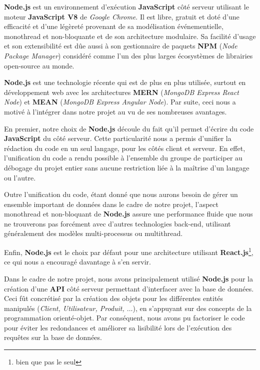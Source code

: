 \documentclass[a4paper,12pt]{report}
\theoremstyle{break}
\theoremstyle{break}
\theoremstyle{break}
\theoremstyle{break}
\theoremstyle{definition}
\theoremstyle{remark}
\begin{document}
\textbf{Node.js} est un environnement d'exécution \textbf{JavaScript} côté serveur utilisant le moteur \textbf{JavaScript V8} de \textit{Google Chrome}. Il est libre, gratuit et doté d'une efficacité et d'une légèreté provenant de sa modélisation événementielle, monothread et non-bloquante et de son architecture modulaire. Sa facilité d'usage et son extensibilité est dûe aussi à son gestionnaire de paquets \textbf{NPM} (\textit{Node Package Manager}) considéré comme l'un des plus larges écosystèmes de librairies open-source au monde.

\textbf{Node.js} est une technologie récente qui est de plus en plus utilisée, surtout en développement web avec les architectures \textbf{MERN} (\textit{MongoDB Express React Node}) et \textbf{MEAN} (\textit{MongoDB Express Angular Node}). Par suite, ceci nous a motivé à l'intégrer dans notre projet au vu de ses nombreuses avantages.

En premier, notre choix de \textbf{Node.js} découle du fait qu'il permet d'écrire du code \textbf{JavaScript} du côté serveur. Cette particularité nous a permis d'unifier la rédaction du code en un seul langage, pour les côtés client et serveur. En effet, l'unification du code a rendu possible à l'ensemble du groupe de participer au débogage du projet entier sans aucune restriction liée à la maîtrise d'un langage ou l'autre.

Outre l'unification du code, étant donné que nous aurons besoin de gérer un ensemble important de données dans le cadre de notre projet, l'aspect monothread et non-bloquant de \textbf{Node.js} assure une performance fluide que nous ne trouverons pas forcément avec d'autres technologies back-end, utilisant généralement des modèles multi-processus ou multithread.

Enfin, \textbf{Node.js} est le choix par défaut pour une architecture utilisant \textbf{React.js}\footnote{bien que pas le seul}, ce qui nous a encouragé davantage à s'en servir.

Dans le cadre de notre projet, nous avons principalement utilisé \textbf{Node.js} pour la création d'une \textbf{API} côté serveur permettant d'interfacer avec la base de données. Ceci fût concrétisé par la création des objets pour les différentes entités manipulés (\textit{Client, Utilisateur, Produit, $\dots$}), en s'appuyant sur des concepts de la programmation orienté-objet. Par conséquent, nous avons pu factoriser le code pour éviter les redondances et  améliorer sa lisibilité lors de l'exécution des requêtes sur la base de données.
\end{document}
